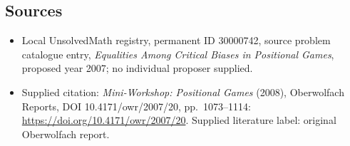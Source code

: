 \documentclass[11pt]{article}
\begin{document}
\subsection{Sources}
\begin{itemize}\item Local UnsolvedMath registry, permanent ID 30000742, source problem catalogue entry, \emph{Equalities Among Critical Biases in Positional Games}, proposed year 2007; no individual proposer supplied.\item Supplied citation: \emph{Mini-Workshop: Positional Games} (2008), Oberwolfach Reports, DOI 10.4171/owr/2007/20, pp.\ 1073--1114: \url{https://doi.org/10.4171/owr/2007/20}. Supplied literature label: original Oberwolfach report.\end{itemize}
\end{document}

